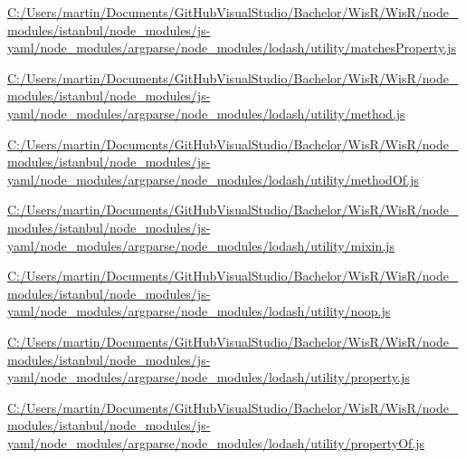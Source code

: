 \begin{DoxyCompactItemize}
\item 
\hyperlink{_c_1_2_users_2martin_2_documents_2_git_hub_visual_studio_2_bachelor_2_wis_r_2_wis_r_2node_module079d43dbdd9255cd2792cdcc172e57f5}{C\+:/\+Users/martin/\+Documents/\+Git\+Hub\+Visual\+Studio/\+Bachelor/\+Wis\+R/\+Wis\+R/node\+\_\+modules/istanbul/node\+\_\+modules/js-\/yaml/node\+\_\+modules/argparse/node\+\_\+modules/lodash/utility/matches\+Property.\+js}
\item 
\hyperlink{_c_1_2_users_2martin_2_documents_2_git_hub_visual_studio_2_bachelor_2_wis_r_2_wis_r_2node_modulec85d2efa78eea3455cd71aac12a12982}{C\+:/\+Users/martin/\+Documents/\+Git\+Hub\+Visual\+Studio/\+Bachelor/\+Wis\+R/\+Wis\+R/node\+\_\+modules/istanbul/node\+\_\+modules/js-\/yaml/node\+\_\+modules/argparse/node\+\_\+modules/lodash/utility/method.\+js}
\item 
\hyperlink{_c_1_2_users_2martin_2_documents_2_git_hub_visual_studio_2_bachelor_2_wis_r_2_wis_r_2node_module7181d123296b6eb010fb35b382e1d1ee}{C\+:/\+Users/martin/\+Documents/\+Git\+Hub\+Visual\+Studio/\+Bachelor/\+Wis\+R/\+Wis\+R/node\+\_\+modules/istanbul/node\+\_\+modules/js-\/yaml/node\+\_\+modules/argparse/node\+\_\+modules/lodash/utility/method\+Of.\+js}
\item 
\hyperlink{_c_1_2_users_2martin_2_documents_2_git_hub_visual_studio_2_bachelor_2_wis_r_2_wis_r_2node_moduleae219ff04fa1a65c0c57ebf49d9aa01d}{C\+:/\+Users/martin/\+Documents/\+Git\+Hub\+Visual\+Studio/\+Bachelor/\+Wis\+R/\+Wis\+R/node\+\_\+modules/istanbul/node\+\_\+modules/js-\/yaml/node\+\_\+modules/argparse/node\+\_\+modules/lodash/utility/mixin.\+js}
\item 
\hyperlink{_c_1_2_users_2martin_2_documents_2_git_hub_visual_studio_2_bachelor_2_wis_r_2_wis_r_2node_modulec38dd94b1ad21e426f4d0a2645f977ab}{C\+:/\+Users/martin/\+Documents/\+Git\+Hub\+Visual\+Studio/\+Bachelor/\+Wis\+R/\+Wis\+R/node\+\_\+modules/istanbul/node\+\_\+modules/js-\/yaml/node\+\_\+modules/argparse/node\+\_\+modules/lodash/utility/noop.\+js}
\item 
\hyperlink{_c_1_2_users_2martin_2_documents_2_git_hub_visual_studio_2_bachelor_2_wis_r_2_wis_r_2node_module6bdff6f01818cd25e196d2a7907fa69b}{C\+:/\+Users/martin/\+Documents/\+Git\+Hub\+Visual\+Studio/\+Bachelor/\+Wis\+R/\+Wis\+R/node\+\_\+modules/istanbul/node\+\_\+modules/js-\/yaml/node\+\_\+modules/argparse/node\+\_\+modules/lodash/utility/property.\+js}
\item 
\hyperlink{_c_1_2_users_2martin_2_documents_2_git_hub_visual_studio_2_bachelor_2_wis_r_2_wis_r_2node_module90d9190dd7eb53d6aa102fdf1b12888f}{C\+:/\+Users/martin/\+Documents/\+Git\+Hub\+Visual\+Studio/\+Bachelor/\+Wis\+R/\+Wis\+R/node\+\_\+modules/istanbul/node\+\_\+modules/js-\/yaml/node\+\_\+modules/argparse/node\+\_\+modules/lodash/utility/property\+Of.\+js}

\end{DoxyCompactItemize}
